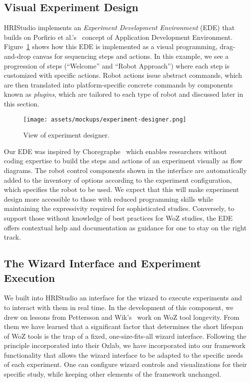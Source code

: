 \documentclass[letterpaper, 10 pt, conference]{subfiles/ieeeconf}
\begin{document}
\subsection{Visual Experiment Design}

HRIStudio implements an \emph{Experiment Development Environment} (EDE) that builds on Porfirio et al.'s~\cite{Porfirio2023} concept of Application Development Environment. Figure~\ref{fig:experiment-designer} shows how this EDE is implemented as a visual programming, drag-and-drop canvas for sequencing steps and actions. In this example, we see a progression of steps (``Welcome'' and ``Robot Approach'') where each step is customized with specific actions. Robot actions issue abstract commands, which are then translated into platform-specific concrete commands by components known as \emph{plugins}, which are tailored to each type of robot and discussed later in this section.

\begin{figure}[ht]
    \centering
\texttt{[image: assets/mockups/experiment-designer.png]}
\caption{View of experiment designer.}
\label{fig:experiment-designer}
\end{figure}

Our EDE was inspired by Choregraphe~\cite{Pot2009} which enables researchers without coding expertise to build the steps and actions of an experiment visually as flow diagrams. The robot control components shown in the interface are automatically added to the inventory of options according to the experiment configuration, which specifies the robot to be used. We expect that this will make experiment design more accessible to those with reduced programming skills while maintaining the expressivity required for sophisticated studies. Conversely, to support those without knowledge of best practices for WoZ studies, the EDE offers contextual help and documentation as guidance for one to stay on the right track.

\subsection{The Wizard Interface and Experiment Execution}

We built into HRIStudio an interface for the wizard to execute experiments and to interact with them in real time. In the development of this component, we drew on lessons from Pettersson and Wik's~\cite{Pettersson2015} work on WoZ tool longevity. From them we have learned that a significant factor that determines the short lifespan of WoZ tools is the trap of a fixed, one-size-fits-all wizard interface. Following the principle incorporated into their Ozlab, we have incorporated into our framework functionality that allows the wizard interface to be adapted to the specific needs of each experiment. One can configure wizard controls and visualizations for their specific study, while keeping other elements of the framework unchanged.
\end{document}
